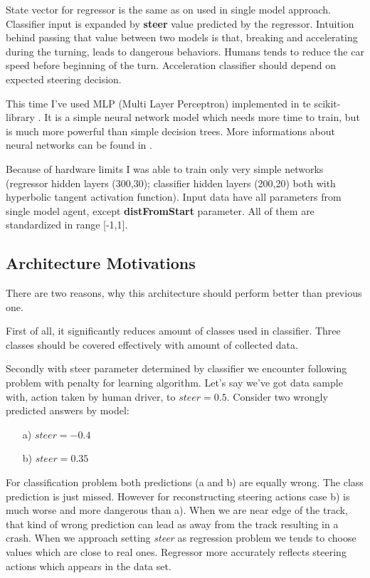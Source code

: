 \documentclass[declaration,shortabstract,english,inz]{iithesis}
\begin{document}
State vector for regressor is the same as on used in single model approach.
Classifier input is expanded by \textbf{steer} value predicted by the regressor.
Intuition behind passing that value between two models is that, breaking and accelerating during the turning, leads to dangerous behaviors.
Humans tends to reduce the car speed before beginning of the turn.
Acceleration classifier should depend on expected steering decision.


This time I've used MLP (Multi Layer Perceptron) implemented in te scikit-library \cite{scikit_learn}.
It is a simple neural network model which needs more time to train, but is much more powerful than simple decision trees. More informations about neural networks can be found in \cite{neuraln_nets}.


Because of hardware limits I was able to train only very simple networks (regressor hidden layers (300,30); classifier hidden layers (200,20) both with hyperbolic tangent activation function).
Input data have all parameters from single model agent, except \textbf{distFromStart} parameter.
All of them are standardized in range [-1,1].

\subsection{Architecture Motivations}

There are two reasons, why this architecture should perform better than previous one.

First of all, it significantly reduces amount of classes used in classifier.
Three classes should be covered effectively with amount of collected data.

Secondly with steer parameter determined by classifier we encounter following problem with penalty for learning algorithm.
Let's say we've got data sample with, action taken by human driver, to $steer=0.5$.
Consider two wrongly predicted answers by model:
\begin{itemize}
    \item[a)] $steer=-0.4$
    \item[b)] $steer=0.35$
\end{itemize}

For classification problem both predictions (a and b) are equally wrong.
 The class prediction is just missed.
However for reconstructing steering actions case b) is much worse and more dangerous than a).
When we are near edge of the track, that kind of wrong prediction can lead as away from the track resulting in a crash.
When we approach setting \textit{steer} as regression problem we tends to choose values which are close to real ones.
Regressor more accurately reflects steering actions which appears in the data set.
\end{document}
